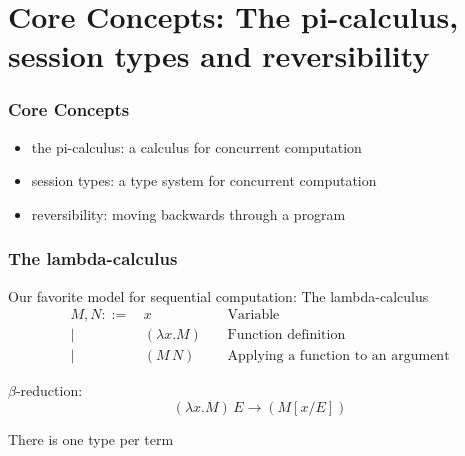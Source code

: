 \documentclass[12pt]{beamer}
\begin{document}
\section{Core Concepts: The pi-calculus, session types and reversibility}


\begin{frame}
\frametitle{Core Concepts}
\begin{center}


\begin{itemize}
    \item the pi-calculus: a calculus for concurrent computation
    \item session types: a type system for concurrent computation
    \item reversibility: moving backwards through a program
\end{itemize}


\end{center}
\end{frame}


\begin{frame}
\frametitle{The lambda-calculus}

Our favorite model for sequential computation: The lambda-calculus 
\begingroup
\fontsize{10pt}{12pt}\selectfont
\begin{align*}
M, N ::= \, & x \,\,\, \, \, & \text{Variable}\\
|\,\,\, & (\lambda x. M) \,\,\, \, \, &\text{Function definition}\\
|\,\,\, & (M\, N) \,\,\, \, \, \, \, \, \, &\text{Applying a function to an argument} 
\end{align*}
\endgroup



$\beta$-reduction: 
$$(\lambda x. M) \, E \rightarrow (M[x/E])$$

There is one type per term

\end{frame}
\end{document}
